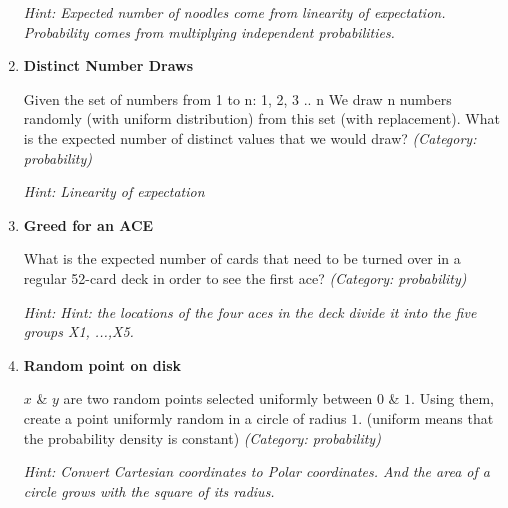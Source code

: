 \begin{enumerate}
\small\emph{Hint: Expected number of noodles come from linearity of expectation. Probability comes from multiplying independent probabilities.}





\item \textbf{Distinct Number Draws}

Given the set of numbers from 1 to n: { 1, 2, 3 .. n } We draw n numbers randomly (with uniform distribution) from this set (with replacement). What is the expected number of distinct values that we would draw?
\small\emph{(Category: probability)}

\small\emph{Hint: Linearity of expectation}





\item \textbf{Greed for an ACE}

What is the expected number of cards that need to be turned over in a regular 52-card deck in order to see the first ace?
\small\emph{(Category: probability)}

\small\emph{Hint: Hint: the locations of the four aces in the deck divide it into the five groups X1, ...,X5.}





\item \textbf{Random point on disk}

$x$ \& $y$ are two random points selected uniformly between $0$ \& $1$. Using them, create a point uniformly random in a circle of radius $1$. (uniform means that the probability density is constant)
\small\emph{(Category: probability)}

\small\emph{Hint: Convert Cartesian coordinates to Polar coordinates. And the area of a circle grows with the square of its radius.}





\end{enumerate}
